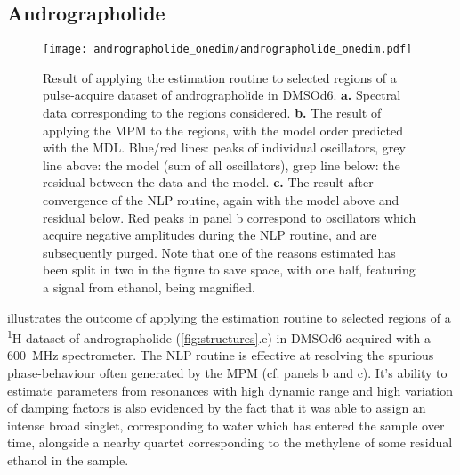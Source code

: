 \subsection{Andrographolide}
\begin{sidewaysfigure}
    \centering
    \texttt{[image: andrographolide\_onedim/andrographolide\_onedim.pdf]}
    \caption[
        Result of applying the estimation routine to selected regions of a
        pulse-acquire dataset of andrographolide.
    ]{
        Result of applying the estimation routine to selected regions of a
        pulse-acquire dataset of andrographolide in \acs{DMSOd6}.
        \textbf{a.} Spectral data corresponding to the regions considered.
        \textbf{b.} The result of applying the \acs{MPM} to the regions, with
        the model order predicted with the \acs{MDL}. Blue/red lines: peaks of
        individual oscillators, grey line above: the model (sum of all
        oscillators), grep line below: the residual between the data and the model.
        \textbf{c.} The result after convergence of the \acs{NLP} routine, again
        with the model above and residual below.
        Red peaks in panel b correspond to oscillators which acquire negative
        amplitudes during the \acs{NLP} routine, and are subsequently purged.
        Note that one of the reasons estimated has been split in two in the
        figure to save space, with one half, featuring a signal from ethanol,
        being magnified.
    }
    \label{fig:andro-onedim}
\end{sidewaysfigure}
 illustrates the outcome of applying the
estimation routine to selected regions of a \textsuperscript{1}H dataset of
andrographolide (\cref{fig:structures}.e) in \acs{DMSOd6} acquired with
a \qty{600}{\mega\hertz} spectrometer. The \ac{NLP}
routine is effective at resolving the spurious phase-behaviour often generated
by the \ac{MPM} (cf. panels b and c).
It's ability to estimate parameters from resonances with high
dynamic range and high variation of damping factors is also evidenced by the
fact that it was able to assign an intense broad singlet, corresponding to
water which has entered the sample over time, alongside a nearby quartet
corresponding to the methylene of some residual ethanol in the sample.

